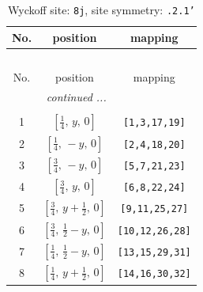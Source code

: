 \documentclass[fleqn,8pt]{jsarticle}
\begin{document}
\begin{longtable}{ccc}
\caption{Wyckoff site: {\tt 8j}, site symmetry: {\tt .2.1'}}
 \\
 \hline \hline
No. & position & mapping \\ \hline \endfirsthead

\multicolumn{2}{l}{\tablename\ \thetable{}} \\
 \hline \hline
No. & position & mapping \\ \hline \endhead

 \hline \hline
\multicolumn{2}{r}{\footnotesize\it continued ...} \\ \endfoot

 \hline \hline
\multicolumn{2}{r}{} \\ \endlastfoot

1 & $\left[ \frac{1}{4},\, y,\, 0 \right]$ & {\tt [1,3,17,19]} \\ \hline
2 & $\left[ \frac{1}{4},\, - y,\, 0 \right]$ & {\tt [2,4,18,20]} \\ \hline
3 & $\left[ \frac{3}{4},\, - y,\, 0 \right]$ & {\tt [5,7,21,23]} \\ \hline
4 & $\left[ \frac{3}{4},\, y,\, 0 \right]$ & {\tt [6,8,22,24]} \\ \hline
5 & $\left[ \frac{3}{4},\, y + \frac{1}{2},\, 0 \right]$ & {\tt [9,11,25,27]} \\ \hline
6 & $\left[ \frac{3}{4},\, \frac{1}{2} - y,\, 0 \right]$ & {\tt [10,12,26,28]} \\ \hline
7 & $\left[ \frac{1}{4},\, \frac{1}{2} - y,\, 0 \right]$ & {\tt [13,15,29,31]} \\ \hline
8 & $\left[ \frac{1}{4},\, y + \frac{1}{2},\, 0 \right]$ & {\tt [14,16,30,32]} \\
\end{longtable}
\renewcommand{\arraystretch}{1.2}
\end{document}
